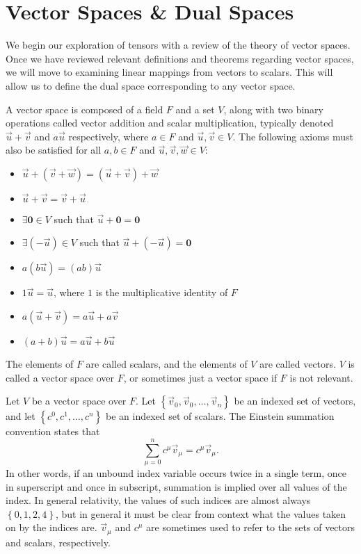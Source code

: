 \documentclass[../main.tex]{subfiles}
\begin{document}
    \chapter{Vector Spaces \& Dual Spaces}
    We begin our exploration of tensors with a review of the theory of vector spaces. Once we have reviewed relevant definitions and theorems regarding vector spaces, we will move to examining linear mappings from vectors to scalars. This will allow us to define the dual space corresponding to any vector space.
    \begin{definition}
        A vector space is composed of a field \(F\) and a set \(V\), along with two binary operations called vector addition and scalar multiplication, typically denoted \(\vec{u}+\vec{v}\) and \(a\vec{u}\) respectively, where \(a\in{}F\) and \(\vec{u},\vec{v}\in{}V\). The following axioms must also be satisfied for all \(a,b\in{}F\) and \(\vec{u},\vec{v},\vec{w}\in{}V\):
        \begin{itemize}
            \item\(\vec{u}+(\vec{v}+\vec{w})=(\vec{u}+\vec{v})+\vec{w}\)
            \item\(\vec{u}+\vec{v}=\vec{v}+\vec{u}\)
            \item\(\exists{}\mathbf{0}\in{}V\) such that \(\vec{u}+\mathbf{0}=\mathbf{0}\)
            \item\(\exists{}(-\vec{u})\in{}V\) such that \(\vec{u}+(-\vec{u})=\mathbf{0}\)
            \item\(a(b\vec{u})=(ab)\vec{u}\)
            \item\(1\vec{u}=\vec{u}\), where \(1\) is the multiplicative identity of \(F\)
            \item\(a(\vec{u}+\vec{v})=a\vec{u}+a\vec{v}\)
            \item\((a+b)\vec{u}=a\vec{u}+b\vec{u}\)
        \end{itemize}
        The elements of \(F\) are called scalars, and the elements of \(V\) are called vectors. \(V\) is called a vector space over \(F\), or sometimes just a vector space if \(F\) is not relevant.
    \end{definition}
    \begin{notation}
        Let \(V\) be a vector space over \(F\). Let \(\left\{\vec{v}_{0},\vec{v}_{0},\dots,\vec{v}_{n}\right\}\) be an indexed set of vectors, and let \(\left\{c^{0},c^{1},\dots,c^{n}\right\}\) be an indexed set of scalars. The Einstein summation convention states that
        \begin{equation*}
            \sum_{\mu=0}^{n}c^{\mu}\vec{v}_{\mu}=c^{\mu}\vec{v}_{\mu}.
        \end{equation*}
        In other words, if an unbound index variable occurs twice in a single term, once in superscript and once in subscript, summation is implied over all values of the index. In general relativity, the values of such indices are almost always \(\left\{0,1,2,4\right\}\), but in general it must be clear from context what the values taken on by the indices are. \(\vec{v}_{\mu}\) and \(c^{\mu}\) are sometimes used to refer to the sets of vectors and scalars, respectively.
    \end{notation}
\end{document}
